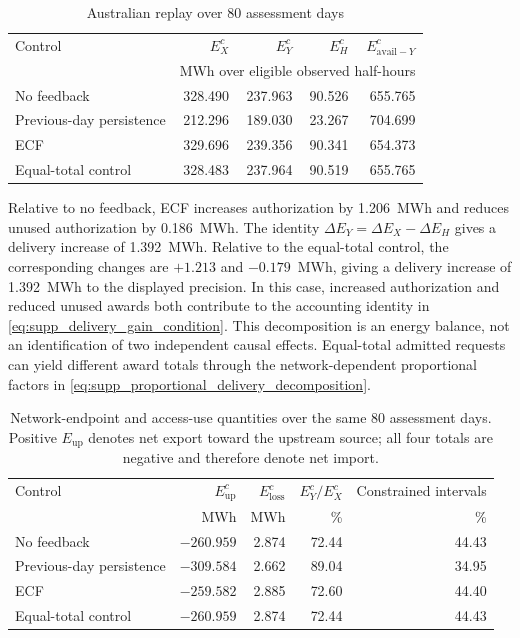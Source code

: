 \documentclass[11pt]{article}
\begin{document}
\begin{table}[!ht]
\centering
\caption{Australian replay over 80 assessment days}
\label{tab:supp_au_results}
\small
\begin{tabular}{@{}lrrrr@{}}
\toprule
Control & $E_X^c$ & $E_Y^c$ & $E_H^c$ & $E_{\mathrm{avail}-Y}^c$ \\
 & \multicolumn{4}{c}{MWh over eligible observed half-hours} \\
\midrule
No feedback & 328.490 & 237.963 & 90.526 & 655.765 \\
Previous-day persistence & 212.296 & 189.030 & 23.267 & 704.699 \\
ECF & 329.696 & 239.356 & 90.341 & 654.373 \\
Equal-total control & 328.483 & 237.964 & 90.519 & 655.765 \\
\bottomrule
\end{tabular}
\end{table}

Relative to no feedback, ECF increases authorization by 1.206~MWh and
reduces unused authorization by 0.186~MWh. The identity
$\Delta E_Y=\Delta E_X-\Delta E_H$ gives a delivery increase of 1.392~MWh.
Relative to the equal-total control, the corresponding changes are
$+1.213$ and $-0.179$~MWh, giving a delivery increase of 1.392~MWh to the displayed precision.
In this case, increased authorization and reduced unused awards both
contribute to the accounting identity in
\eqref{eq:supp_delivery_gain_condition}. This decomposition is an energy
balance, not an identification of two independent causal effects.
Equal-total admitted requests can yield different award totals through
the network-dependent proportional factors in
\eqref{eq:supp_proportional_delivery_decomposition}.

\begin{table}[!ht]
\centering
\caption{Network-endpoint and access-use quantities over the same 80 assessment
days. Positive $E_{\mathrm{up}}$ denotes net export toward the upstream source;
all four totals are negative and therefore denote net import.}
\label{tab:supp_au_network_endpoint}
\small
\begin{tabular}{@{}lrrrr@{}}
\toprule
Control & $E_{\mathrm{up}}^c$ & $E_{\mathrm{loss}}^c$ & $E_Y^c/E_X^c$ & Constrained intervals \\
 & MWh & MWh & \% & \% \\
\midrule
No feedback & $-260.959$ & 2.874 & 72.44 & 44.43 \\
Previous-day persistence & $-309.584$ & 2.662 & 89.04 & 34.95 \\
ECF & $-259.582$ & 2.885 & 72.60 & 44.40 \\
Equal-total control & $-260.959$ & 2.874 & 72.44 & 44.43 \\
\bottomrule
\end{tabular}
\end{table}
\end{document}
